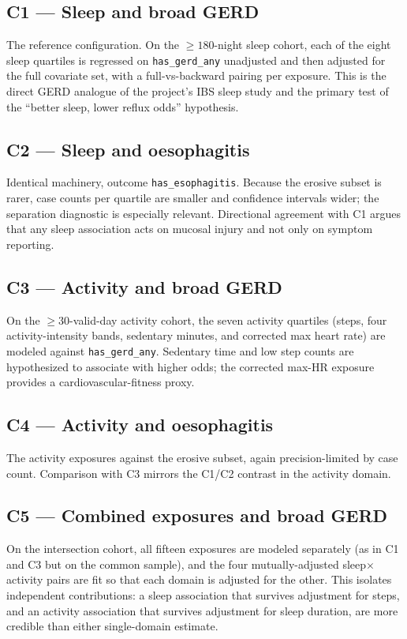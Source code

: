 \documentclass[11pt]{article}
\newcommand{\code}[1]{\texttt{\small #1}}
\begin{document}
\subsection{C1 --- Sleep and broad GERD}
The reference configuration. On the $\geq 180$-night sleep cohort, each of the eight sleep quartiles is
regressed on \code{has_gerd_any} unadjusted and then adjusted for the full covariate set, with a
full-vs-backward pairing per exposure. This is the direct GERD analogue of the project's IBS sleep
study and the primary test of the ``better sleep, lower reflux odds'' hypothesis.

\subsection{C2 --- Sleep and oesophagitis}
Identical machinery, outcome \code{has_esophagitis}. Because the erosive subset is rarer, case counts
per quartile are smaller and confidence intervals wider; the separation diagnostic is especially
relevant. Directional agreement with C1 argues that any sleep association acts on mucosal injury and
not only on symptom reporting.

\subsection{C3 --- Activity and broad GERD}
On the $\geq 30$-valid-day activity cohort, the seven activity quartiles (steps, four activity-intensity
bands, sedentary minutes, and corrected max heart rate) are modeled against \code{has_gerd_any}. Sedentary
time and low step counts are hypothesized to associate with higher odds; the corrected max-HR exposure
provides a cardiovascular-fitness proxy.

\subsection{C4 --- Activity and oesophagitis}
The activity exposures against the erosive subset, again precision-limited by case count. Comparison
with C3 mirrors the C1/C2 contrast in the activity domain.

\subsection{C5 --- Combined exposures and broad GERD}
On the intersection cohort, all fifteen exposures are modeled separately (as in C1 and C3 but on the
common sample), and the four mutually-adjusted sleep$\times$activity pairs are fit so that each domain
is adjusted for the other. This isolates independent contributions: a sleep association that survives
adjustment for steps, and an activity association that survives adjustment for sleep duration, are more
credible than either single-domain estimate.
\end{document}
